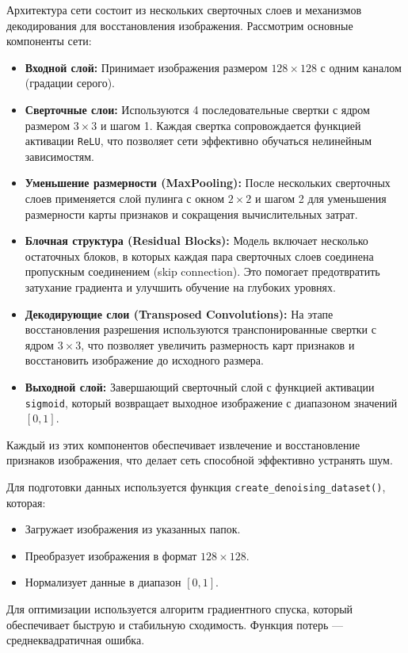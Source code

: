 \documentclass[12pt, a4paper]{article}
\begin{document}
Архитектура сети состоит из нескольких сверточных слоев и механизмов декодирования для восстановления изображения. Рассмотрим основные компоненты сети:
\begin{itemize}
	\item \textbf{Входной слой:} Принимает изображения размером $128 \times 128$ с одним каналом (градации серого). 
	
	\item \textbf{Сверточные слои:} Используются 4 последовательные свертки с ядром размером $3 \times 3$ и шагом 1. Каждая свертка сопровождается функцией активации \texttt{ReLU}, что позволяет сети эффективно обучаться нелинейным зависимостям. %
	
	\item \textbf{Уменьшение размерности (MaxPooling):} После нескольких сверточных слоев применяется слой пулинга с окном $2 \times 2$ и шагом 2 для уменьшения размерности карты признаков и сокращения вычислительных затрат.
	
	\item \textbf{Блочная структура (Residual Blocks):} Модель включает несколько остаточных блоков, в которых каждая пара сверточных слоев соединена пропускным соединением (skip connection). Это помогает предотвратить затухание градиента и улучшить обучение на глубоких уровнях.
	
	\item \textbf{Декодирующие слои (Transposed Convolutions):} На этапе восстановления разрешения используются транспонированные свертки с ядром $3 \times 3$, что позволяет увеличить размерность карт признаков и восстановить изображение до исходного размера.
	
	\item \textbf{Выходной слой:} Завершающий сверточный слой с функцией активации \texttt{sigmoid}, который возвращает выходное изображение с диапазоном значений $[0, 1]$.
\end{itemize}

Каждый из этих компонентов обеспечивает извлечение и восстановление признаков изображения, что делает сеть способной эффективно устранять шум.








Для подготовки данных используется функция \texttt{create\_denoising\_dataset()}, которая:
\begin{itemize}
	\item Загружает изображения из указанных папок.
	\item Преобразует изображения в формат $128 \times 128$.
	\item Нормализует данные в диапазон $[0, 1]$.
\end{itemize}
 Для оптимизации используется алгоритм градиентного спуска, который обеспечивает быструю и стабильную сходимость. Функция потерь — среднеквадратичная ошибка.
\end{document}
